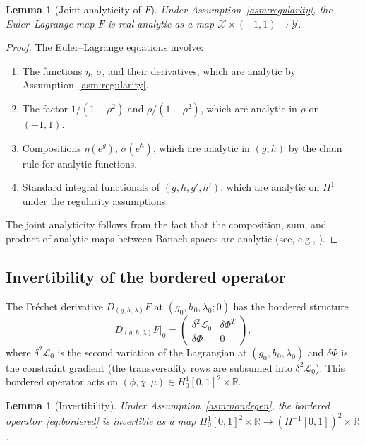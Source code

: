 \documentclass[11pt]{article}
\newtheorem{lemma}[theorem]{Lemma}
\theoremstyle{definition}
\newcommand{\R}{\mathbb{R}}
\newcommand{\Hone}{H^1}
\begin{document}
\begin{lemma}[Joint analyticity of $F$]\label{lem:F_analytic}
Under Assumption~\ref{asm:regularity}, the Euler--Lagrange map $F$ is real-analytic as a map $\mathcal{X} \times (-1,1) \to \mathcal{Y}$.
\end{lemma}

\begin{proof}
The Euler--Lagrange equations involve:
\begin{enumerate}[label=(\alph*)]
  \item The functions $\eta$, $\sigma$, and their derivatives, which are analytic by Assumption~\ref{asm:regularity}.
  \item The factor $1/(1-\rho^2)$ and $\rho/(1-\rho^2)$, which are analytic in $\rho$ on $(-1,1)$.
  \item Compositions $\eta(e^g)$, $\sigma(e^h)$, which are analytic in $(g,h)$ by the chain rule for analytic functions.
  \item Standard integral functionals of $(g, h, g', h')$, which are analytic on $\Hone$ under the regularity assumptions.
\end{enumerate}
The joint analyticity follows from the fact that the composition, sum, and product of analytic maps between Banach spaces are analytic (see, e.g., \cite[Chapter~4]{BonnansShapiro}).
\end{proof}

\subsection{Invertibility of the bordered operator}

The Fr\'echet derivative $D_{(g,h,\lambda)}F$ at $(g_0, h_0, \lambda_0; 0)$ has the bordered structure
\begin{equation}\label{eq:bordered}
  D_{(g,h,\lambda)}F\bigg|_{0} =
  \begin{pmatrix}
    \delta^2\mathcal{L}_0 & \delta\Phi^T \\
    \delta\Phi & 0
  \end{pmatrix},
\end{equation}
where $\delta^2\mathcal{L}_0$ is the second variation of the Lagrangian at $(g_0, h_0, \lambda_0)$ and $\delta\Phi$ is the constraint gradient (the transversality rows are subsumed into $\delta^2\mathcal{L}_0$). This bordered operator acts on $(\phi, \chi, \mu) \in \Hone_0[0,1]^2 \times \R$.

\begin{lemma}[Invertibility]\label{lem:invertibility}
Under Assumption~\ref{asm:nondegen}, the bordered operator~\eqref{eq:bordered} is invertible as a map $\Hone_0[0,1]^2 \times \R \to (H^{-1}[0,1])^2 \times \R$.
\end{lemma}
\end{document}
